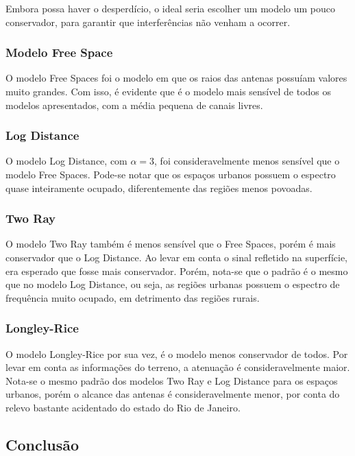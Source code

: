Embora possa haver o desperdício, o ideal seria escolher um modelo um pouco conservador, para garantir que interferências não venham a ocorrer.

\subsubsection{Modelo Free Space}

O modelo Free Spaces foi o modelo em que os raios das antenas possuíam valores muito grandes. Com isso, é evidente que é o modelo mais sensível de todos os modelos apresentados, com a média pequena de canais livres.

\subsubsection{Log Distance}

O modelo Log Distance, com \begin{math}\alpha = 3 \end{math}, foi consideravelmente menos sensível que o modelo Free Spaces. Pode-se notar que os espaços urbanos possuem o espectro quase inteiramente ocupado, diferentemente das regiões menos povoadas.

\subsubsection{Two Ray}

O modelo Two Ray também é menos sensível que o Free Spaces, porém é mais conservador que o Log Distance. Ao levar em conta o sinal refletido na superfície, era esperado que fosse mais conservador. Porém, nota-se que o padrão é o mesmo que no modelo Log Distance, ou seja, as regiões urbanas possuem o espectro de frequência muito ocupado, em detrimento das regiões rurais.

\subsubsection{Longley-Rice}

O modelo Longley-Rice por sua vez, é o modelo menos conservador de todos. Por levar em conta as informações do terreno, a atenuação é consideravelmente maior. Nota-se o mesmo padrão dos modelos Two Ray e Log Distance para os espaços urbanos, porém o alcance das antenas é consideravelmente menor, por conta do relevo bastante acidentado do estado do Rio de Janeiro.

\subsection{Conclusão}

